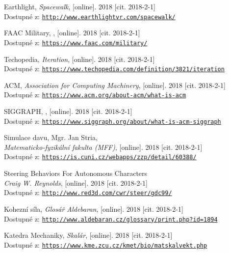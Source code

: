 \documentclass[czech,public,dept460,male,cpdeclaration]{diploma}
\begin{document}
\begin{thebibliography}{99}
	 Earthlight,
		\textit{Spacewalk}, [online]. 2018 [cit. 2018-2-1]\\
		Dostupné z: \href{http://www.earthlightvr.com/spacewalk/}{\texttt{http://www.earthlightvr.com/spacewalk/}}
		
	 FAAC Military,
		, [online]. 2018 [cit. 2018-2-1]\\
		Dostupné z: \href{https://www.faac.com/military/}{\texttt{https://www.faac.com/military/}}
		
	 Techopedia,
		\textit{Iteration}, [online]. 2018 [cit. 2018-2-1]\\
		Dostupné z: \href{https://www.techopedia.com/definition/3821/iteration}{\texttt{https://www.techopedia.com/definition/3821/iteration}}
		
	 ACM,
		\textit{Association for Computing Machinery}, [online]. 2018 [cit. 2018-2-1]\\
		Dostupné z: \href{https://www.acm.org/about-acm/what-is-acm}{\texttt{https://www.acm.org/about-acm/what-is-acm}}
		
	 SIGGRAPH,
		, [online]. 2018 [cit. 2018-2-1]\\
		Dostupné z: \href{https://www.siggraph.org/about/what-is-acm-siggraph}{\texttt{https://www.siggraph.org/about/what-is-acm-siggraph}}
		
	 Simulace davu, Mgr. Jan Stria,\\
		\textit{Matematicko-fyzikální fakulta (MFF)}, [online]. 2018 [cit. 2018-2-1]\\
		Dostupné z: \href{https://is.cuni.cz/webapps/zzp/detail/60388/}{\texttt{https://is.cuni.cz/webapps/zzp/detail/60388/}}
		
	 Steering Behaviors For Autonomous Characters\\
		\textit{Craig W. Reynolds}, [online]. 2018 [cit. 2018-2-1]\\
		Dostupné z: \href{http://www.red3d.com/cwr/steer/gdc99/}{\texttt{http://www.red3d.com/cwr/steer/gdc99/}}
		
	 Kohezní síla,
		\textit{Glosář Aldebaran}, [online]. 2018 [cit. 2018-2-1]\\
		Dostupné z: \href{http://www.aldebaran.cz/glossary/print.php?id=1894}{\texttt{http://www.aldebaran.cz/glossary/print.php?id=1894}}
		
	 Katedra Mechaniky,
		\textit{Skalár}, [online]. 2018 [cit. 2018-2-1]\\
		Dostupné z: \href{https://www.kme.zcu.cz/kmet/bio/matskalvekt.php}{\texttt{https://www.kme.zcu.cz/kmet/bio/matskalvekt.php}}
		

\end{thebibliography}
\end{document}
